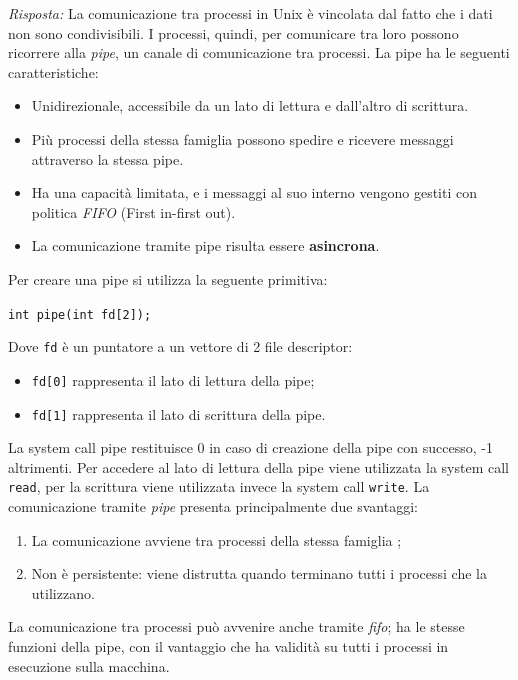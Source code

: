 \documentclass{article}
\newenvironment{solution}
    {\textit{Risposta:}}
    {}
\begin{document}
\begin{solution}
La comunicazione tra processi in Unix è vincolata dal fatto che i dati non sono condivisibili.
\newline
I processi, quindi, per comunicare tra loro possono ricorrere alla \textit{pipe}, un canale di comunicazione tra processi.
La pipe ha le seguenti caratteristiche:
\begin{itemize}
    \item Unidirezionale, accessibile da un lato di lettura e dall’altro di scrittura.
    \item Più processi della stessa famiglia possono spedire e ricevere messaggi attraverso la stessa pipe.
    \item Ha una capacità limitata, e i messaggi al suo interno vengono gestiti con politica \textit{FIFO} (First in-first out).
    \item La comunicazione tramite pipe risulta essere \textbf{asincrona}.
\end{itemize}
Per creare una pipe si utilizza la seguente primitiva:
\begin{center}
\texttt{int pipe(int fd[2]);}  
\end{center}
Dove \texttt{fd} è un puntatore a un vettore di 2 file descriptor:
\begin{itemize}
    \item \texttt{fd[0]} rappresenta il lato di lettura della pipe;
    \item \texttt{fd[1]} rappresenta il lato di scrittura della pipe.
\end{itemize}
La system call pipe restituisce 0 in caso di creazione della pipe con successo, -1 altrimenti.
\newline
Per accedere al lato di lettura della pipe viene utilizzata la system call \texttt{read}, per la scrittura viene utilizzata invece la system call \texttt{write}.
\newline
La comunicazione tramite \textit{pipe} presenta principalmente due svantaggi:
\begin{enumerate}
    \item La comunicazione avviene tra processi della stessa famiglia ;
    \item Non è persistente: viene distrutta quando terminano tutti i processi che la utilizzano.
\end{enumerate}
La comunicazione tra processi può avvenire anche tramite \textit{fifo}; ha le stesse funzioni della pipe, con il vantaggio che ha validità su tutti i processi in esecuzione sulla macchina.

\end{solution}
\end{document}
